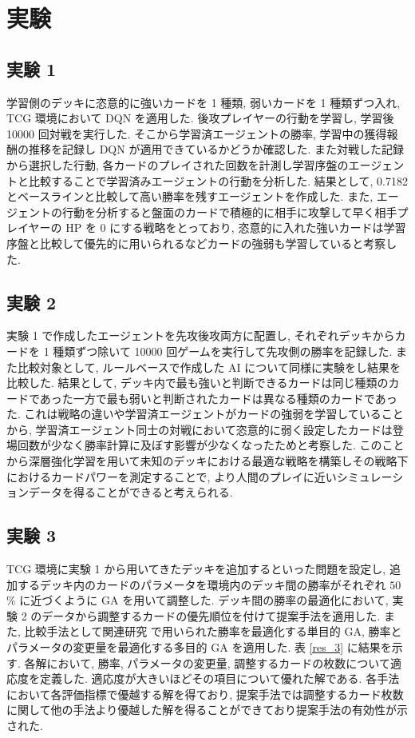 \documentclass[a4paper,twoside,twocolumn,10pt]{article}
\begin{document}
 

\section{実験}
\subsection{実験 1}
 学習側のデッキに恣意的に強いカードを 1 種類, 弱いカードを 1 種類ずつ入れ, TCG 環境において DQN を適用した. 後攻プレイヤーの行動を学習し, 学習後 10000 回対戦を実行した. そこから学習済エージェントの勝率, 学習中の獲得報酬の推移を記録し DQN が適用できているかどうか確認した. また対戦した記録から選択した行動, 各カードのプレイされた回数を計測し学習序盤のエージェントと比較することで学習済みエージェントの行動を分析した.
結果として, 0.7182 とベースラインと比較して高い勝率を残すエージェントを作成した. また, エージェントの行動を分析すると盤面のカードで積極的に相手に攻撃して早く相手プレイヤーの HP を 0 にする戦略をとっており, 恣意的に入れた強いカードは学習序盤と比較して優先的に用いられるなどカードの強弱も学習していると考察した.
\subsection{実験 2}
実験 1 で作成したエージェントを先攻後攻両方に配置し, それぞれデッキからカードを 1 種類ずつ除いて 10000 回ゲームを実行して先攻側の勝率を記録した. また比較対象として, ルールベースで作成した AI について同様に実験をし結果を比較した. 結果として, デッキ内で最も強いと判断できるカードは同じ種類のカードであった一方で最も弱いと判断されたカードは異なる種類のカードであった. これは戦略の違いや学習済エージェントがカードの強弱を学習していることから, 学習済エージェント同士の対戦において恣意的に弱く設定したカードは登場回数が少なく勝率計算に及ぼす影響が少なくなったためと考察した. このことから深層強化学習を用いて未知のデッキにおける最適な戦略を構築しその戦略下におけるカードパワーを測定することで, より人間のプレイに近いシミュレーションデータを得ることができると考えられる.
\subsection{実験 3}
TCG 環境に実験 1 から用いてきたデッキを追加するといった問題を設定し, 追加するデッキ内のカードのパラメータを環境内のデッキ間の勝率がそれぞれ $50$ \% に近づくように GA を用いて調整した. デッキ間の勝率の最適化において, 実験 2 のデータから調整するカードの優先順位を付けて提案手法を適用した. また, 比較手法として関連研究 \cite{EvolvingHearthStone} で用いられた勝率を最適化する単目的 GA, 勝率とパラメータの変更量を最適化する多目的 GA を適用した. 表 \ref{res_3} に結果を示す. 各解において, 勝率, パラメータの変更量, 調整するカードの枚数について適応度を定義した. 適応度が大きいほどその項目について優れた解である. 各手法において各評価指標で優越する解を得ており, 提案手法では調整するカード枚数に関して他の手法より優越した解を得ることができており提案手法の有効性が示された. 
\end{document}
